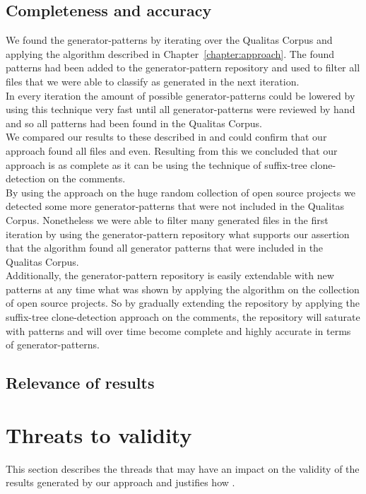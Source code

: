 \subsection{Completeness and accuracy}
We found the generator-patterns by iterating over the Qualitas Corpus and applying the algorithm described in Chapter~\ref{chapter:approach}. The found patterns had been added to the generator-pattern repository and used to filter all files that we were able to classify as generated in the next iteration.\\
In every iteration the amount of possible generator-patterns could be lowered by using this technique very fast until all generator-patterns were reviewed by hand and so all patterns had been found in the Qualitas Corpus.\\
We compared our results to these described in \cite{Bernwieser2014} and could confirm that our approach found all files and even. Resulting from this we concluded that our approach is as complete as it can be using the technique of suffix-tree clone-detection on the comments.\\
By using the approach on the huge random collection of open source projects we detected some more generator-patterns that were not included in the Qualitas Corpus. Nonetheless we were able to filter many generated files in the first iteration by using the generator-pattern repository what supports our assertion that the algorithm found all generator patterns that were included in the Qualitas Corpus.\\
Additionally, the generator-pattern repository is easily extendable with new patterns at any time what was shown by applying the algorithm on the collection of open source projects. So by gradually extending the repository by applying the suffix-tree clone-detection approach on the comments, the repository will saturate with patterns and will over time become complete and highly accurate in terms of generator-patterns.

\subsection{Relevance of results}


\section{Threats to validity}
This section describes the threads that may have an impact on the validity of the results generated by our approach and justifies how .
